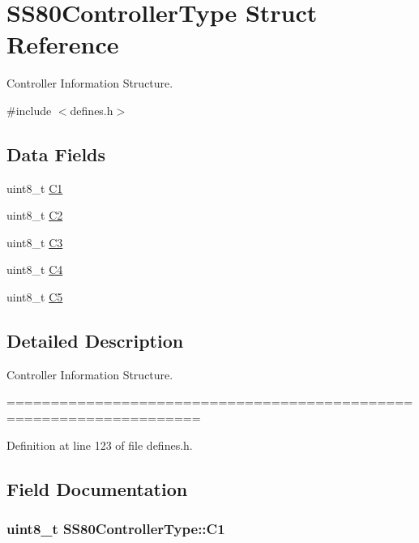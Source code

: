 \hypertarget{structSS80ControllerType}{}\section{S\+S80\+Controller\+Type Struct Reference}
\label{structSS80ControllerType}


Controller Information Structure.  




{\ttfamily \#include $<$defines.\+h$>$}

\subsection*{Data Fields}
\begin{DoxyCompactItemize}
\item 
uint8\+\_\+t \hyperlink{structSS80ControllerType_aa71282f54bf2b38fd8ace152aa9221b7}{C1}
\item 
uint8\+\_\+t \hyperlink{structSS80ControllerType_a99a2d4b94a756273b7ad2e4bdc786de8}{C2}
\item 
uint8\+\_\+t \hyperlink{structSS80ControllerType_acdbaaa95ad03c2a60f9e5cb0f9558ff8}{C3}
\item 
uint8\+\_\+t \hyperlink{structSS80ControllerType_a1d3d0ce7719f1fcb2d4c8c0c70750cdf}{C4}
\item 
uint8\+\_\+t \hyperlink{structSS80ControllerType_ae968d050e8c1a5b20a607dd16b4322c8}{C5}
\end{DoxyCompactItemize}


\subsection{Detailed Description}
Controller Information Structure. 

==================================================================== 

Definition at line 123 of file defines.\+h.



\subsection{Field Documentation}
\subsubsection[{\texorpdfstring{C1}{C1}}]{\setlength{\rightskip}{0pt plus 5cm}uint8\+\_\+t S\+S80\+Controller\+Type\+::\+C1}\hypertarget{structSS80ControllerType_aa71282f54bf2b38fd8ace152aa9221b7}{}\label{structSS80ControllerType_aa71282f54bf2b38fd8ace152aa9221b7}


